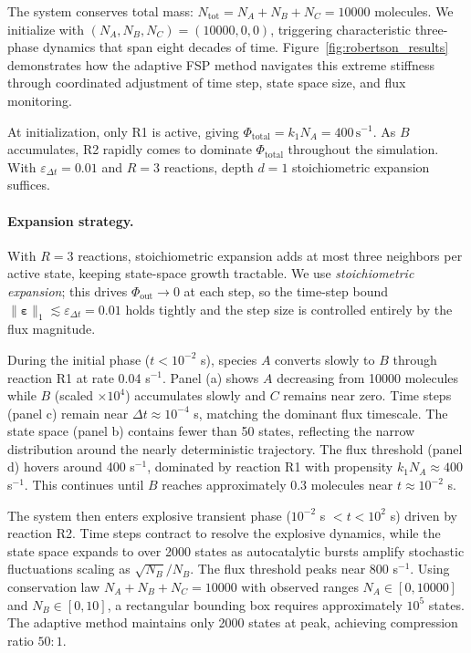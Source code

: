 \documentclass[onefignum,onetabnum]{siamart171218}
\begin{document}
The system conserves total mass: $N_{\text{tot}} = N_A + N_B + N_C = 10000$ molecules. We initialize with $(N_A, N_B, N_C) = (10000, 0, 0)$, triggering characteristic three-phase dynamics that span eight decades of time. Figure~\ref{fig:robertson_results} demonstrates how the adaptive FSP method navigates this extreme stiffness through coordinated adjustment of time step, state space size, and flux monitoring.

At initialization, only R1 is active, giving $\Phi_{\mathrm{total}} = k_1 N_A = 400\,\text{s}^{-1}$.
As $B$ accumulates, R2 rapidly comes to dominate $\Phi_{\mathrm{total}}$ throughout the simulation.
With $\varepsilon_{\Delta t} = 0.01$ and $R = 3$ reactions, depth $d=1$ stoichiometric expansion suffices.

\paragraph{Expansion strategy.}
With $R=3$ reactions, stoichiometric expansion adds at most three neighbors per active state, keeping state-space growth tractable.  We use \emph{stoichiometric expansion}; this drives $\Phi_{\mathrm{out}} \to 0$ at each step, so the time-step bound $\|\boldsymbol{\varepsilon}\|_1 \lesssim \varepsilon_{\Delta t} = 0.01$ holds tightly and the step size is controlled entirely by the flux magnitude.

During the initial phase ($t < 10^{-2}$ s), species $A$ converts slowly to $B$ through reaction R1 at rate 0.04 s$^{-1}$. Panel (a) shows $A$ decreasing from 10000 molecules while $B$ (scaled $\times 10^4$) accumulates slowly and $C$ remains near zero. Time steps (panel c) remain near $\Delta t \approx 10^{-4}$ s, matching the dominant flux timescale. The state space (panel b) contains fewer than 50 states, reflecting the narrow distribution around the nearly deterministic trajectory. The flux threshold (panel d) hovers around 400 s$^{-1}$, dominated by reaction R1 with propensity $k_1 N_A \approx 400$ s$^{-1}$. This continues until $B$ reaches approximately 0.3 molecules near $t \approx 10^{-2}$ s.

The system then enters explosive transient phase ($10^{-2}$ s $< t < 10^2$ s) driven by reaction R2. Time steps contract to resolve the explosive dynamics, while the state space expands to over 2000 states as autocatalytic bursts amplify stochastic fluctuations scaling as $\sqrt{N_B}/N_B$. The flux threshold peaks near 800 s$^{-1}$. Using conservation law $N_A + N_B + N_C = 10000$ with observed ranges $N_A \in [0, 10000]$ and $N_B \in [0, 10]$, a rectangular bounding box requires approximately $10^5$ states. The adaptive method maintains only 2000 states at peak, achieving compression ratio $50:1$.
\end{document}
